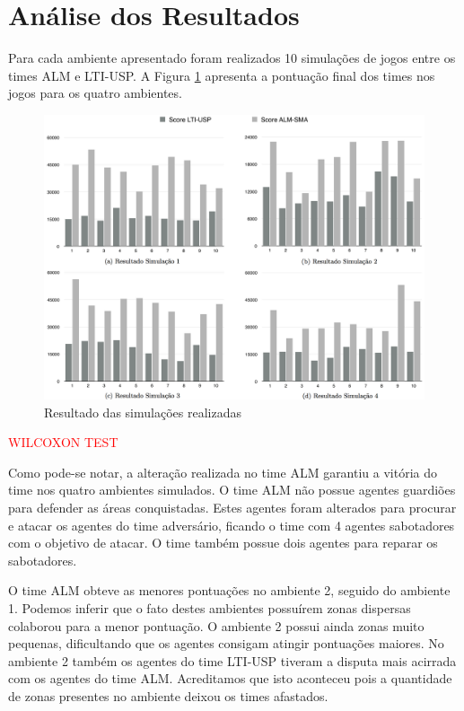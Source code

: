 \documentclass{llncs}
\begin{document}
\section{Análise dos Resultados}

Para cada ambiente apresentado foram realizados 10 simulações de jogos entre os times ALM e LTI-USP. A Figura \ref{fig:resultados} apresenta a pontuação final dos times nos jogos para os quatro ambientes.

\begin{figure}[!ht]
\centering
\includegraphics[width=1\linewidth]{./images/simulations-chart.png}
\caption{Resultado das simulações realizadas}
\label{fig:resultados}
\end{figure}

\textcolor{red}{WILCOXON TEST}

Como pode-se notar, a alteração realizada no time ALM garantiu a vitória do time nos quatro ambientes simulados. O time ALM não possue agentes guardiões para defender as áreas conquistadas. Estes agentes foram alterados para procurar e atacar os agentes do time adversário, ficando o time com 4 agentes sabotadores com o objetivo de atacar. O time também possue dois agentes para reparar os sabotadores.

O time ALM obteve as menores pontuações no ambiente 2, seguido do ambiente 1. Podemos inferir que o fato destes ambientes possuírem zonas dispersas colaborou para a menor pontuação. O ambiente 2 possui ainda zonas muito pequenas, dificultando que os agentes consigam atingir pontuações maiores. No ambiente 2 também os agentes do time LTI-USP tiveram a disputa mais acirrada com os agentes do time ALM. Acreditamos que isto aconteceu pois a quantidade de zonas presentes no ambiente deixou os times afastados.
\end{document}
